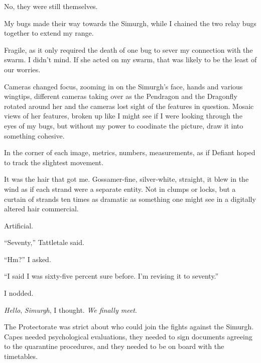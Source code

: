 No, they were still themselves.



My bugs made their way towards the Simurgh, while I chained the two relay bugs together to extend my range.



Fragile, as it only required the death of one bug to sever my connection with the swarm.  I didn't mind.  If she acted on my swarm, that was likely to be the least of our worries.



Cameras changed focus, zooming in on the Simurgh's face, hands and various wingtips, different cameras taking over as the Pendragon and the Dragonfly rotated around her and the cameras lost sight of the features in question.  Mosaic views of her features, broken up like I might see if I were looking through the eyes of my bugs, but without my power to coodinate the picture, draw it into something cohesive.



In the corner of each image, metrics, numbers, measurements, as if Defiant hoped to track the slightest movement.



It was the hair that got me.  Gossamer-fine, silver-white, straight, it blew in the wind as if each strand were a separate entity.  Not in clumps or locks, but a curtain of strands ten times as dramatic as something one might see in a digitally altered hair commercial.



Artificial.



``Seventy,'' Tattletale said.



``Hm?'' I asked.



``I said I was sixty-five percent sure before.  I'm revising it to seventy.''



I nodded.



\emph{Hello}, \emph{Simurgh}, I thought.  \emph{We finally meet}.



The Protectorate was strict about who could join the fights against the Simurgh.  Capes needed psychological evaluations, they needed to sign documents agreeing to the quarantine procedures, and they needed to be on board with the timetables.



